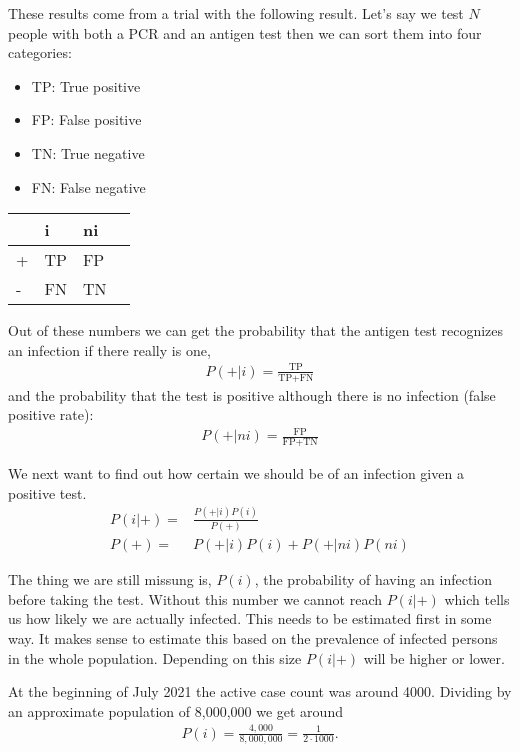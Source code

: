 These results come from a trial with the following result.
Let's say we test $N$ people with both a PCR and an antigen test then we can sort them into four categories:
\begin{itemize}
  \item TP: True positive 
  \item FP: False positive
  \item TN: True negative
  \item FN: False negative
\end{itemize}

\begin{table}[h]
  \centering
\begin{tabular}{llll}
      & i  & ni \\ 
\hline
    + & TP & FP \\
    - & FN & TN \\
\end{tabular}  
\end{table}

Out of these numbers we can get the probability that the antigen test recognizes an infection if there really is one,
\begin{align}
  P(+|i) = \frac{\text{TP}}{\text{TP}+\text{FN}}
\end{align} and 
the probability that the test is positive although there is no infection (false positive rate):
\begin{align}
  P(+|ni) = \frac{\text{FP}}{\text{FP}+\text{TN}}
\end{align}

We next want to find out how certain we should be of an infection given a positive test.
\begin{align}
    P(i|+) =& \frac{P(+|i)P(i)}{P(+)} \\
    P(+)   =& P(+|i)P(i) + P(+|ni)P(ni)
\end{align}

The thing we are still missung is, $P(i)$, the probability of having an infection before taking the test.
Without this number we cannot reach $P(i|+)$ which tells us how likely we are actually infected.
This needs to be estimated first in some way. It makes sense to 
estimate this based on the prevalence of infected persons in the whole population.
Depending on this size $P(i|+)$ will be higher or lower.

At the beginning of July 2021 the active case count was around 4000. Dividing by an approximate population of 8,000,000
we get around
\begin{align}
  P(i)=\frac{4,000}{8,000,000} = \frac{1}{2 \cdot 1000}.
\end{align}

